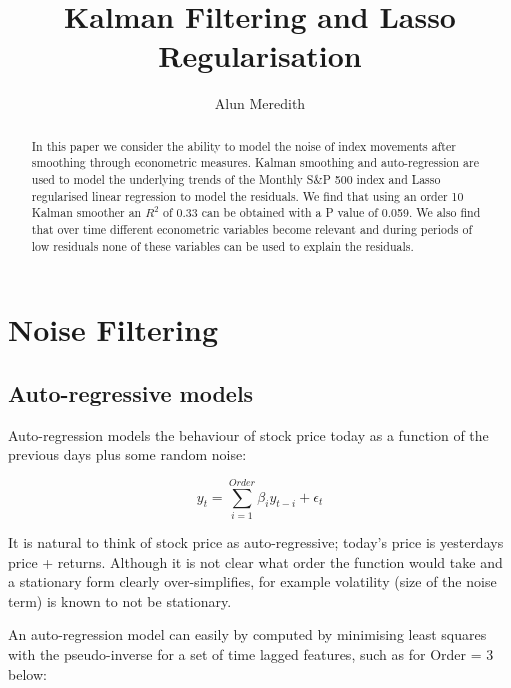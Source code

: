 \documentclass{sig-alternate-05-2015}
\begin{document}
\author{Alun Meredith\vspace{-2ex}%
}
\title{Kalman Filtering and Lasso Regularisation \vspace{-2ex}%
}
\maketitle

\vspace{-30mm}

\begin{abstract}
In this paper we consider the ability to model the noise of index movements after smoothing through econometric measures. Kalman smoothing and auto-regression are used to model the underlying trends of the Monthly S\&P 500 index and Lasso regularised linear regression to model the residuals. We find that using an order 10 Kalman smoother an $R^2$ of 0.33 can be obtained with a P value of 0.059. We also find that over time different econometric variables become relevant and during periods of low residuals none of these variables can be used to explain the residuals. 
\end{abstract}

\section{Noise Filtering}

\subsection{Auto-regressive models}

Auto-regression models the behaviour of stock price today as a function of the previous days plus some random noise:

\begin{equation}
y_{t} = \sum_{i=1}^{Order} \beta_i y_{t-i} + \epsilon_t
\end{equation}

It is natural to think of stock price as auto-regressive; today's price is yesterdays price + returns. Although it is not clear what order the function would take and a stationary form clearly over-simplifies, for example volatility (size of the noise term) is known to not be stationary. 

An auto-regression model can easily by computed by minimising least squares with the pseudo-inverse for a set of time lagged features, such as for Order = 3 below:
\end{document}
